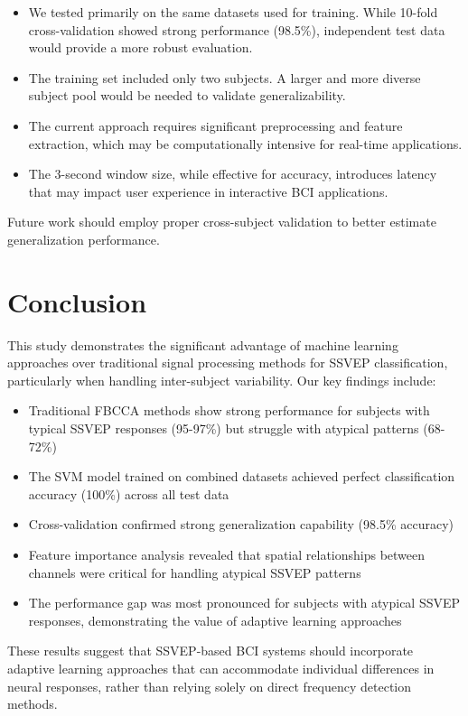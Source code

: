 \documentclass[conference]{IEEEtran}
\begin{document}
\begin{itemize}
    \item We tested primarily on the same datasets used for training. While 10-fold cross-validation showed strong performance (98.5\%), independent test data would provide a more robust evaluation.
    \item The training set included only two subjects. A larger and more diverse subject pool would be needed to validate generalizability.
    \item The current approach requires significant preprocessing and feature extraction, which may be computationally intensive for real-time applications.
    \item The 3-second window size, while effective for accuracy, introduces latency that may impact user experience in interactive BCI applications.
\end{itemize}

Future work should employ proper cross-subject validation to better estimate generalization performance.

\section{Conclusion}
This study demonstrates the significant advantage of machine learning approaches over traditional signal processing methods for SSVEP classification, particularly when handling inter-subject variability. Our key findings include:

\begin{itemize}
    \item Traditional FBCCA methods show strong performance for subjects with typical SSVEP responses (95-97\%) but struggle with atypical patterns (68-72\%)
    \item The SVM model trained on combined datasets achieved perfect classification accuracy (100\%) across all test data
    \item Cross-validation confirmed strong generalization capability (98.5\% accuracy)
    \item Feature importance analysis revealed that spatial relationships between channels were critical for handling atypical SSVEP patterns
    \item The performance gap was most pronounced for subjects with atypical SSVEP responses, demonstrating the value of adaptive learning approaches
\end{itemize}

These results suggest that SSVEP-based BCI systems should incorporate adaptive learning approaches that can accommodate individual differences in neural responses, rather than relying solely on direct frequency detection methods.
\end{document}
